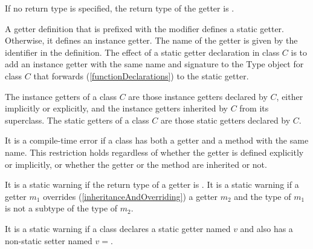 \documentclass{article}
\newcommand{\code}[1]{{\sf #1}}
\begin{document}

\LMHash{}
If no return type is specified, the return type of the getter is  \DYNAMIC{}.

\LMHash{}
A getter definition that is prefixed with the \STATIC{} modifier defines a static getter. Otherwise, it defines an instance getter. The name of the getter is given by the identifier in the definition. The effect of a static getter declaration in class $C$ is to add an instance getter with the same name and signature to the \code{Type} object for class $C$ that forwards (\ref{functionDeclarations})  to the static getter.


\LMHash{}
The instance getters of a class $C$ are those instance getters declared by $C$, either implicitly or explicitly, and the instance getters inherited by $C$ from its superclass. The static getters of a class $C$ are those static getters declared by $C$.

\LMHash{}
It is a compile-time error if a class has both a getter and a method with the same name. This restriction holds regardless of whether the getter is defined explicitly or implicitly, or whether the getter or the method are inherited or not.


\LMHash{}
It is a static warning if the return type of a getter is \VOID.
It is a static warning if a getter $m_1$ overrides  (\ref{inheritanceAndOverriding}) a getter
$m_2$ and the type of $m_1$ is not a subtype of the type of $m_2$.

\LMHash{}
It is a static warning if a class declares a static getter named $v$ and also has a non-static setter named $v=$.

\end{document}
